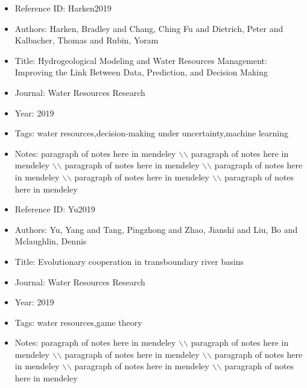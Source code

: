 \documentclass[11pt]{article}
\begin{document}
\noindent\citep{Harken2019} 
\begin{itemize} 
\item{Reference ID:  Harken2019} 

\item{Authors:  Harken, Bradley and Chang, Ching Fu and Dietrich, Peter and Kalbacher, Thomas and Rubin, Yoram} 

\item{Title:  Hydrogeological Modeling and Water Resources Management: Improving the Link Between Data, Prediction, and Decision Making} 

\item{Journal:  Water Resources Research} 

\item{Year:  2019} 

\item{Tags:  water resources,decision-making under uncertainty,machine learning} 

\item{Notes:  paragraph of notes here in mendeley $\backslash$$\backslash$ paragraph of notes here in mendeley $\backslash$$\backslash$ paragraph of notes here in mendeley $\backslash$$\backslash$ paragraph of notes here in mendeley $\backslash$$\backslash$ paragraph of notes here in mendeley $\backslash$$\backslash$ paragraph of notes here in mendeley} 

\end{itemize}\medskip



\noindent\citep{Yu2019} 
\begin{itemize} 
\item{Reference ID:  Yu2019} 

\item{Authors:  Yu, Yang and Tang, Pingzhong and Zhao, Jianshi and Liu, Bo and Mclaughlin, Dennis} 

\item{Title:  Evolutionary cooperation in transboundary river basins} 

\item{Journal:  Water Resources Research} 

\item{Year:  2019} 

\item{Tags:  water resources,game theory} 

\item{Notes:  paragraph of notes here in mendeley $\backslash$$\backslash$ paragraph of notes here in mendeley $\backslash$$\backslash$ paragraph of notes here in mendeley $\backslash$$\backslash$ paragraph of notes here in mendeley $\backslash$$\backslash$ paragraph of notes here in mendeley $\backslash$$\backslash$ paragraph of notes here in mendeley} 

\end{itemize}\medskip
\end{document}
